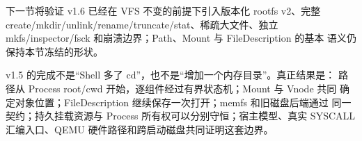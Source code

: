 下一节将验证 v1.6 已经在 VFS 不变的前提下引入版本化 rootfs v2、完整
create/mkdir/unlink/rename/truncate/stat、稀疏大文件、独立
mkfs/inspector/fsck 和崩溃边界；Path、Mount 与 FileDescription 的基本
语义仍保持本节冻结的形状。

\begin{keyidea}
v1.5 的完成不是“Shell 多了 cd”，也不是“增加一个内存目录”。真正结果是：
路径从 Process root/cwd 开始，逐组件经过有界状态机；Mount 与 Vnode 共同
确定对象位置；FileDescription 继续保存一次打开；memfs 和旧磁盘后端通过
同一契约；持久挂载资源与 Process 所有权可以分别守恒；宿主模型、真实
SYSCALL 汇编入口、QEMU 硬件路径和跨启动磁盘共同证明这套边界。
\end{keyidea}
